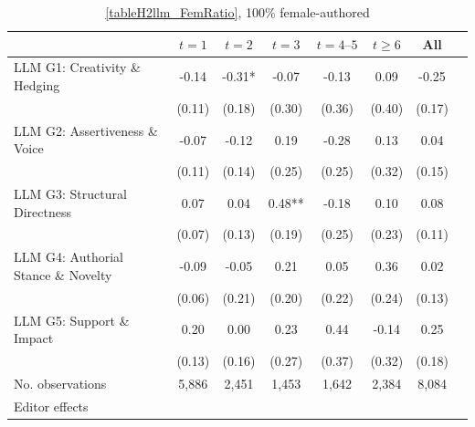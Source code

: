 \begin{table}
    \footnotesize
    \centering
    \begin{threeparttable}
        \caption{\autoref{tableH2llm_FemRatio}, 100\% female-authored}
        \label{tableH2llm_Fem100}
        \begin{tabular}{p{3cm}S@{}S@{}S@{}S@{}S@{}S@{}S@{}}
            \toprule
            &{\(t=1\)}&{\(t=2\)}&{\(t=3\)}&{\(t=4\text{--}5\)}&{\(t\ge6\)}&{All}\\
            \midrule
            LLM G1: Creativity \& Hedging &       -0.14   &       -0.31*  &       -0.07   &       -0.13   &        0.09   &       -0.25   \\
                                          &      (0.11)   &      (0.18)   &      (0.30)   &      (0.36)   &      (0.40)   &      (0.17)   \\
            LLM G2: Assertiveness \& Voice&       -0.07   &       -0.12   &        0.19   &       -0.28   &        0.13   &        0.04   \\
                                          &      (0.11)   &      (0.14)   &      (0.25)   &      (0.25)   &      (0.32)   &      (0.15)   \\
            LLM G3: Structural Directness &        0.07   &        0.04   &        0.48** &       -0.18   &        0.10   &        0.08   \\
                                          &      (0.07)   &      (0.13)   &      (0.19)   &      (0.25)   &      (0.23)   &      (0.11)   \\
            LLM G4: Authorial Stance \& Novelty&       -0.09   &       -0.05   &        0.21   &        0.05   &        0.36   &        0.02   \\
                                          &      (0.06)   &      (0.21)   &      (0.20)   &      (0.22)   &      (0.24)   &      (0.13)   \\
            LLM G5: Support \& Impact     &        0.20   &        0.00   &        0.23   &        0.44   &       -0.14   &        0.25   \\
                                          &      (0.13)   &      (0.16)   &      (0.27)   &      (0.37)   &      (0.32)   &      (0.18)   \\
            \midrule
            No. observations              &       5,886   &       2,451   &       1,453   &       1,642   &       2,384   &       8,084   \\
            \midrule
Editor effects        &           {}   &           {}   &           {}   &           {}   &           {}   &           {}   \\

\end{tabular}
\end{threeparttable}
\end{table}
